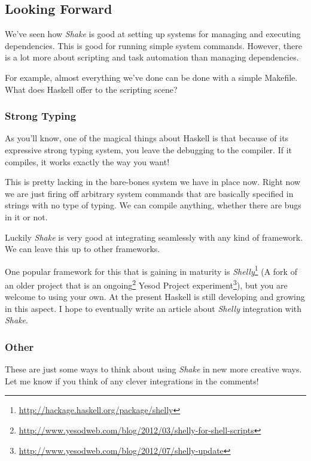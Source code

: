 \documentclass[]{article}
\renewcommand{\href}[2]{#2\footnote{\url{#1}}}
\begin{document}
\subsection{Looking Forward}

We've seen how \emph{Shake} is good at setting up systems for managing and
executing dependencies. This is good for running simple system commands.
However, there is a lot more about scripting and task automation than managing
dependencies.

For example, almost everything we've done can be done with a simple Makefile.
What does Haskell offer to the scripting scene?

\subsubsection{Strong Typing}

As you'll know, one of the magical things about Haskell is that because of its
expressive strong typing system, you leave the debugging to the compiler. If it
compiles, it works exactly the way you want!

This is pretty lacking in the bare-bones system we have in place now. Right now
we are just firing off arbitrary system commands that are basically specified in
strings with no type of typing. We can compile anything, whether there are bugs
in it or not.

Luckily \emph{Shake} is very good at integrating seamlessly with any kind of
framework. We can leave this up to other frameworks.

One popular framework for this that is gaining in maturity is
\href{http://hackage.haskell.org/package/shelly}{\emph{Shelly}} (A fork of an
older project that is an
\href{http://www.yesodweb.com/blog/2012/03/shelly-for-shell-scripts}{ongoing}
Yesod Project
\href{http://www.yesodweb.com/blog/2012/07/shelly-update}{experiment}), but you
are welcome to using your own. At the present Haskell is still developing and
growing in this aspect. I hope to eventually write an article about
\emph{Shelly} integration with \emph{Shake}.

\subsubsection{Other}

These are just some ways to think about using \emph{Shake} in new more creative
ways. Let me know if you think of any clever integrations in the comments!
\end{document}
